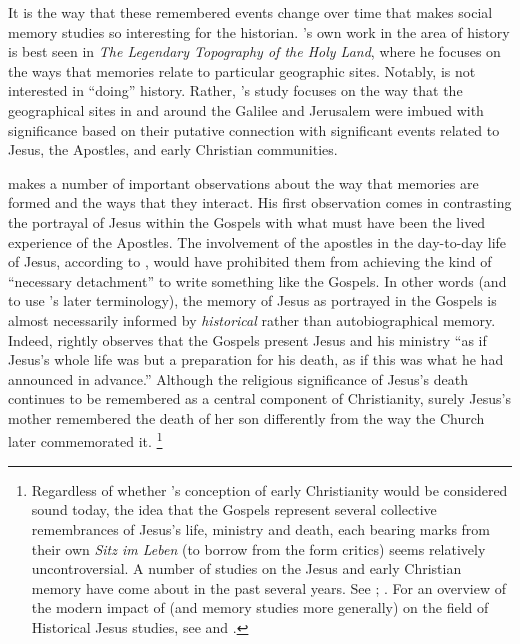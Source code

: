 It is the way that these remembered events change over time that makes social memory studies so interesting for the historian. \halbwachs's own work in the area of history is best seen in \emph{The Legendary Topography of the Holy Land}, where he focuses on the ways that memories relate to particular geographic sites. Notably, \halbwachs is not interested in ``doing'' history. Rather, \halbwachs's study focuses on the way that the geographical sites in and around the Galilee and Jerusalem were imbued with significance based on their putative connection with significant events related to Jesus, the Apostles, and early Christian communities. 

\halbwachs makes a number of important observations about the way that memories are formed and the ways that they interact. His first observation comes in contrasting the portrayal of Jesus within the Gospels with what must have been the lived experience of the Apostles.%
    \autocite[193--198]{halbwachs1992}
The involvement of the apostles in the day-to-day life of Jesus, according to \halbwachs, would have prohibited them from achieving the kind of ``necessary detachment'' to write something like the Gospels. In other words (and to use \halbwachs's later terminology), the memory of Jesus as portrayed in the Gospels is almost necessarily informed by \emph{historical} rather than autobiographical memory.%
    \autocite[194]{halbwachs1992}
Indeed, \halbwachs rightly observes that the Gospels present Jesus and his ministry ``as if Jesus's whole life was but a preparation for his death, as if this was what he had announced in advance.''%
    \autocite[198]{halbwachs1992}
Although the religious significance of Jesus's death continues to be remembered as a central component of Christianity, surely Jesus's mother remembered the death of her son differently from the way the Church later commemorated it.%
    \footnote{%
        Regardless of whether \halbwachs's conception of early Christianity would be considered sound today, the idea that the Gospels represent several collective remembrances of Jesus's life, ministry and death, each bearing marks from their own \emph{Sitz im Leben} (to borrow from the form critics) seems relatively uncontroversial. A number of studies on the Jesus and early Christian memory have come about in the past several years. See 
        \cite{ledonne2009}; 
        \cite{rodriguez2010}. For an overview of the modern impact of \halbwachs (and memory studies more generally) on the field of Historical Jesus studies, see 
        \cite{keith_ec2015} and 
        \cite{keith_ec2015b}.}

